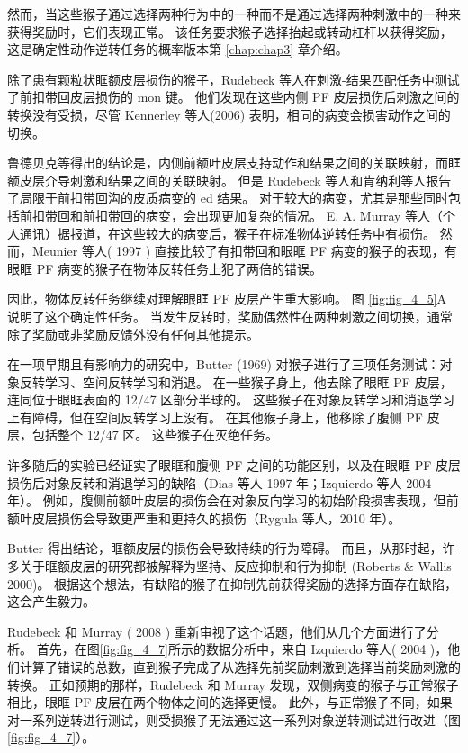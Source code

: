 然而，当这些猴子通过选择两种行为中的一种而不是通过选择两种刺激中的一种来获得奖励时，它们表现正常。
该任务要求猴子选择抬起或转动杠杆以获得奖励，这是确定性动作逆转任务的概率版本第 \ref{chap:chap3} 章介绍。\par


除了患有颗粒状眶额皮层损伤的猴子，Rudebeck 等人在刺激-结果匹配任务中测试了前扣带回皮层损伤的 mon 键。
他们发现在这些内侧 PF 皮层损伤后刺激之间的转换没有受损，尽管 Kennerley 等人(2006) 表明，相同的病变会损害动作之间的切换。\par



鲁德贝克等得出的结论是，内侧前额叶皮层支持动作和结果之间的关联映射，而眶额皮层介导刺激和结果之间的关联映射。
但是 Rudebeck 等人和肯纳利等人报告了局限于前扣带回沟的皮质病变的 ed 结果。
对于较大的病变，尤其是那些同时包括前扣带回和前扣带回的病变，会出现更加复杂的情况。
E. A. Murray 等人（个人通讯）据报道，在这些较大的病变后，猴子在标准物体逆转任务中有损伤。
然而，Meunier 等人( 1997 ) 直接比较了有扣带回和眼眶 PF 病变的猴子的表现，有眼眶 PF 病变的猴子在物体反转任务上犯了两倍的错误。  \par


因此，物体反转任务继续对理解眼眶 PF 皮层产生重大影响。
图 \ref{fig:fig_4_5}A 说明了这个确定性任务。
当发生反转时，奖励偶然性在两种刺激之间切换，通常除了奖励或非奖励反馈外没有任何其他提示。\par


在一项早期且有影响力的研究中，Butter (1969) 对猴子进行了三项任务测试：对象反转学习、空间反转学习和消退。
在一些猴子身上，他去除了眼眶 PF 皮层，连同位于眼眶表面的 12/47 区部分半球的。
这些猴子在对象反转学习和消退学习上有障碍，但在空间反转学习上没有。
在其他猴子身上，他移除了腹侧 PF 皮层，包括整个 12/47 区。
这些猴子在灭绝任务。\par


许多随后的实验已经证实了眼眶和腹侧 PF 之间的功能区别，以及在眼眶 PF 皮层损伤后对象反转和消退学习的缺陷（Dias 等人 1997 年；Izquierdo 等人 2004 年）。
例如，腹侧前额叶皮层的损伤会在对象反向学习的初始阶段损害表现，但前额叶皮层损伤会导致更严重和更持久的损伤（Rygula 等人，2010 年）。\par


 Butter 得出结论，眶额皮层的损伤会导致持续的行为障碍。
而且，从那时起，许多关于眶额皮层的研究都被解释为坚持、反应抑制和行为抑制 (Roberts \& Wallis 2000)。
根据这个想法，有缺陷的猴子在抑制先前获得奖励的选择方面存在缺陷，这会产生毅力。\par


Rudebeck 和 Murray ( 2008 ) 重新审视了这个话题，他们从几个方面进行了分析。
首先，在图\ref{fig:fig_4_7}所示的数据分析中，来自 Izquierdo 等人( 2004 )，他们计算了错误的总数，直到猴子完成了从选择先前奖励刺激到选择当前奖励刺激的转换。
正如预期的那样，Rudebeck 和 Murray 发现，双侧病变的猴子与正常猴子相比，眼眶 PF 皮层在两个物体之间的选择更慢。
此外，与正常猴子不同，如果对一系列逆转进行测试，则受损猴子无法通过这一系列对象逆转测试进行改进（图\ref{fig:fig_4_7}）。\par


